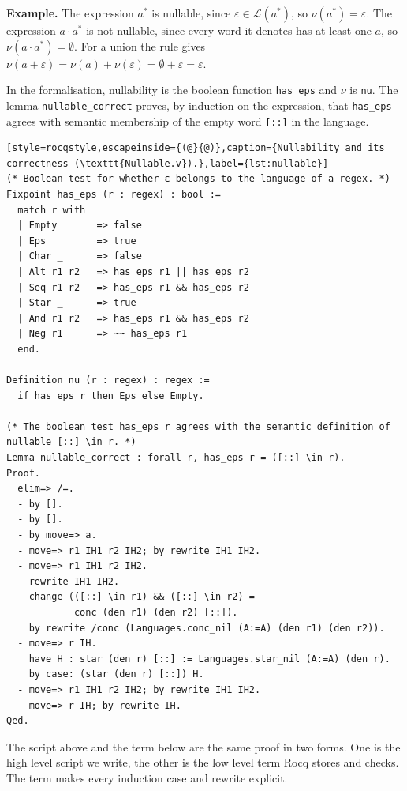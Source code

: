 \noindent\textbf{Example.} The expression $a^{*}$ is nullable, since
$\varepsilon\in\mathcal{L}(a^{*})$, so $\nu(a^{*})=\varepsilon$. The expression
$a\cdot a^{*}$ is not nullable, since every word it denotes has at least one $a$, so
$\nu(a\cdot a^{*})=\emptyset$. For a union the rule gives
$\nu(a+\varepsilon)=\nu(a)+\nu(\varepsilon)=\emptyset+\varepsilon=\varepsilon$.

In the formalisation, nullability is the boolean function \texttt{has\_eps} and
$\nu$ is \texttt{nu}. The lemma
\texttt{nullable\_correct} proves, by induction on the expression, that
\texttt{has\_eps} agrees with semantic membership of the empty word \texttt{[::]}
in the language.

\begin{lstlisting}[style=rocqstyle,escapeinside={(@}{@)},caption={Nullability and its correctness (\texttt{Nullable.v}).},label={lst:nullable}]
(* Boolean test for whether ε belongs to the language of a regex. *)
Fixpoint has_eps (r : regex) : bool :=
  match r with
  | Empty       => false
  | Eps         => true
  | Char _      => false
  | Alt r1 r2   => has_eps r1 || has_eps r2
  | Seq r1 r2   => has_eps r1 && has_eps r2
  | Star _      => true
  | And r1 r2   => has_eps r1 && has_eps r2
  | Neg r1      => ~~ has_eps r1
  end.

Definition nu (r : regex) : regex :=
  if has_eps r then Eps else Empty.

(* The boolean test has_eps r agrees with the semantic definition of nullable [::] \in r. *)
Lemma nullable_correct : forall r, has_eps r = ([::] \in r).
Proof.
  elim=> /=.
  - by [].
  - by [].
  - by move=> a.
  - move=> r1 IH1 r2 IH2; by rewrite IH1 IH2.
  - move=> r1 IH1 r2 IH2.
    rewrite IH1 IH2.
    change (([::] \in r1) && ([::] \in r2) =
            conc (den r1) (den r2) [::]).
    by rewrite /conc (Languages.conc_nil (A:=A) (den r1) (den r2)).
  - move=> r IH.
    have H : star (den r) [::] := Languages.star_nil (A:=A) (den r).
    by case: (star (den r) [::]) H.
  - move=> r1 IH1 r2 IH2; by rewrite IH1 IH2.
  - move=> r IH; by rewrite IH.
Qed.
\end{lstlisting}

The script above and the term below are the same proof in two forms. One is the high level script we write, the other is the low level term Rocq stores and checks. The term makes every induction case and rewrite explicit.



